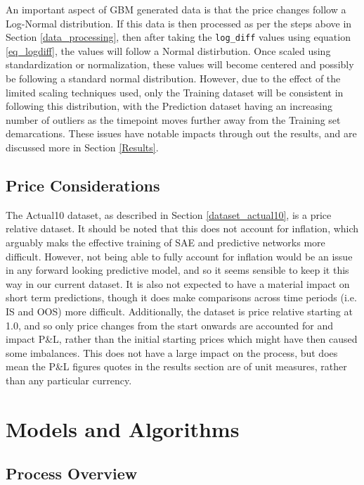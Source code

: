 \documentclass[a4paper,11pt,oneside]{article}
\theoremstyle{plain}
\theoremstyle{definition}
\begin{document}
	An important aspect of GBM generated data is that the price changes follow a Log-Normal distribution. If this data is then processed as per the steps above in Section \ref{data_processing}, then after taking the \texttt{log\_diff} values using equation \eqref{eq_logdiff}, the values will follow a Normal distirbution. Once scaled using standardization or normalization, these values will become centered and possibly be following a standard normal distribution. However, due to the effect of the limited scaling techniques used, only the Training dataset will be consistent in following this distribution, with the Prediction dataset having an increasing number of outliers as the timepoint moves further away from the Training set demarcations. These issues have notable impacts through out the results, and are discussed more in Section \ref{Results}.
	
	\subsection{Price Considerations}\label{data_prices}
	
	The Actual10 dataset, as described in Section \ref{dataset_actual10}, is a price relative dataset. It should be noted that this does not account for inflation, which arguably maks the effective training of SAE and predictive networks more difficult. However, not being able to fully account for inflation would be an issue in any forward looking predictive model, and so it seems sensible to keep it this way in our current dataset. It is also not expected to have a material impact on short term predictions, though it does make comparisons across time periods (i.e. IS and OOS) more difficult. Additionally, the dataset is price relative starting at 1.0, and so only price changes from the start onwards are accounted for and impact P\&L, rather than the initial starting prices which might have then caused some imbalances. This does not have a large impact on the process, but does mean the P\&L figures quotes in the results section are of unit measures, rather than any particular currency.
	
	\newpage
	\section{Models and Algorithms}\label{Implementation}
	\subsection{Process Overview}\label{ProcessOverview}\label{imp_overview}
	
\end{document}
